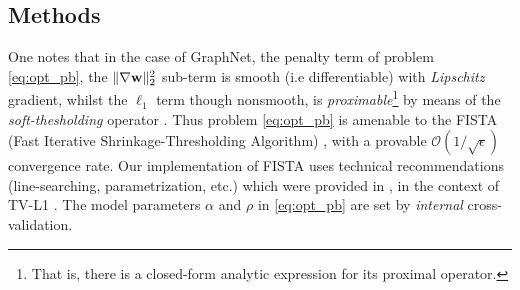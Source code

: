 \subsection{Methods}


One notes that in the case of GraphNet, the penalty term %
of problem
\eqref{eq:opt_pb}, the $\|\nabla
\mathbf{w}\|^2_2$ sub-term is smooth (i.e differentiable) with
\textit{Lipschitz} gradient, whilst the $\ell_{1}$ term though
nonsmooth, is \textit{proximable}\footnote{That is, there is a
  closed-form analytic expression for its proximal operator.} by means
of the \textit{soft-thesholding} operator  \citep{daubechies2004}.  Thus
problem \eqref{eq:opt_pb} is amenable to the FISTA (Fast Iterative
Shrinkage-Thresholding Algorithm)  \citep{beck09fista}, with a provable
$\mathcal{O}(1/\sqrt{\epsilon})$ convergence rate. Our implementation
of FISTA uses technical recommendations
(line-searching, parametrization, etc.) which were provided in
 \citep{dohmatob2014benchmarking}, in the context of TV-L1
 \citep{baldassarre2012,gramfort2013}. The model parameters $\alpha$ and
$\rho$ in \eqref{eq:opt_pb} are set by \textit{internal}
cross-validation.




